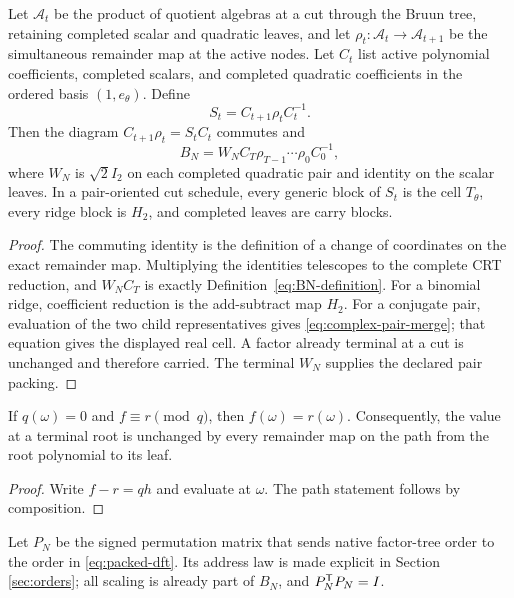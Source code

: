 \begin{lemma}
Let $\mathcal A_t$ be the product of quotient algebras at a cut through the
Bruun tree, retaining completed scalar and quadratic leaves, and let
$\rho_t:\mathcal A_t\to\mathcal A_{t+1}$ be the simultaneous remainder map at
the active nodes.  Let $C_t$ list active polynomial coefficients, completed
scalars, and completed quadratic coefficients in the ordered basis
$(1,e_\theta)$.  Define
\begin{equation}
 S_t=C_{t+1}\rho_tC_t^{-1}.
 \label{eq:normalized-rank}
\end{equation}
Then the diagram $C_{t+1}\rho_t=S_tC_t$ commutes and
\begin{equation}
 B_N=W_NC_T\rho_{T-1}\cdots\rho_0C_0^{-1},
 \label{eq:BN-stage-product}
\end{equation}
where $W_N$ is $\sqrt2 I_2$ on each completed quadratic pair and identity on
the scalar leaves.  In a pair-oriented cut schedule, every generic block of
$S_t$ is the cell $T_\theta$, every ridge block is $H_2$, and completed leaves
are carry blocks.
\end{lemma}
\begin{proof}
The commuting identity is the definition of a change of coordinates on the
exact remainder map.  Multiplying the identities telescopes to the complete
CRT reduction, and $W_NC_T$ is exactly Definition~\ref{eq:BN-definition}.
For a binomial ridge, coefficient reduction is the add-subtract map $H_2$.
For a conjugate pair, evaluation of the two child representatives gives
\eqref{eq:complex-pair-merge}; that equation gives
the displayed real cell.  A factor already terminal at a cut is unchanged and
therefore carried.  The terminal $W_N$ supplies the declared pair packing.
\end{proof}

\begin{lemma}
If $q(\omega)=0$ and $f\equiv r\pmod q$, then $f(\omega)=r(\omega)$.
Consequently, the value at a terminal root is unchanged by every remainder map
on the path from the root polynomial to its leaf.
\end{lemma}
\begin{proof}
Write $f-r=qh$ and evaluate at $\omega$.  The path statement follows by
composition.
\end{proof}

Let $P_N$ be the signed permutation matrix that sends native factor-tree order to the
order in \eqref{eq:packed-dft}.  Its address law is made explicit in Section
\ref{sec:orders}; all scaling is already part of $B_N$, and
$P_N^{\mathsf{T}}P_N=I$.

